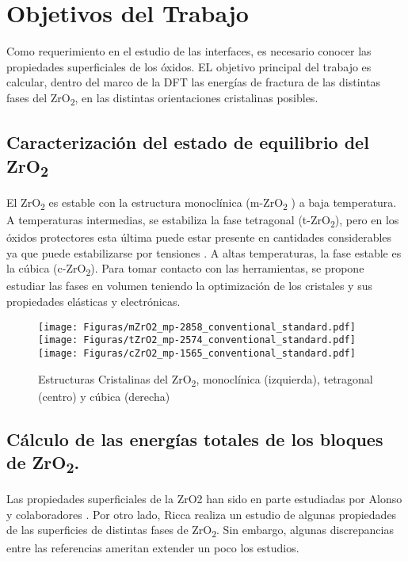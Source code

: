 \section{Objetivos del Trabajo}

Como requerimiento en el estudio de las interfaces, es necesario conocer las 
propiedades superficiales de los óxidos. 
EL objetivo principal del trabajo es calcular, dentro del marco de la DFT
las energías de fractura de las distintas fases del 
ZrO\textsubscript{2}, en las distintas orientaciones cristalinas posibles.

\subsection{Caracterización del estado de equilibrio del ZrO\textsubscript{2}}

El ZrO\textsubscript{2} es estable con la estructura monoclínica (m-ZrO\textsubscript{2 })
a baja temperatura. A temperaturas intermedias, se estabiliza la fase tetragonal 
(t-ZrO\textsubscript{2}), pero en los óxidos protectores esta última puede estar presente
en cantidades considerables \cite{Li2007} ya que puede estabilizarse por tensiones
\cite{Motta2011}. A altas temperaturas, la fase estable es la cúbica (c-ZrO\textsubscript{2}).
Para tomar contacto con las herramientas, se propone estudiar las fases en volumen 
teniendo la optimización de los cristales y sus propiedades elásticas y electrónicas.

\begin{figure}
  \center
  \texttt{[image: Figuras/mZrO2\_mp-2858\_conventional\_standard.pdf]}
  \texttt{[image: Figuras/tZrO2\_mp-2574\_conventional\_standard.pdf]}
  \texttt{[image: Figuras/cZrO2\_mp-1565\_conventional\_standard.pdf]}

  \caption{\protect \label{FiguraCristalesZrO2}
  Estructuras Cristalinas del ZrO\textsubscript{2}, monoclínica (izquierda), tetragonal (centro)
  y cúbica (derecha)
  }
\end{figure}

\subsection{ Cálculo de las energías totales de los bloques de ZrO\textsubscript{2}.}

Las propiedades superficiales de la ZrO2 han sido en parte estudiadas por
Alonso y colaboradores \cite{Alonso2018}. Por otro lado, Ricca
\cite{ricca2015revealing} realiza un estudio de algunas propiedades de las superficies de 
distintas fases de ZrO\textsubscript{2}. Sin embargo, algunas discrepancias entre las referencias
ameritan extender un poco los estudios. 

